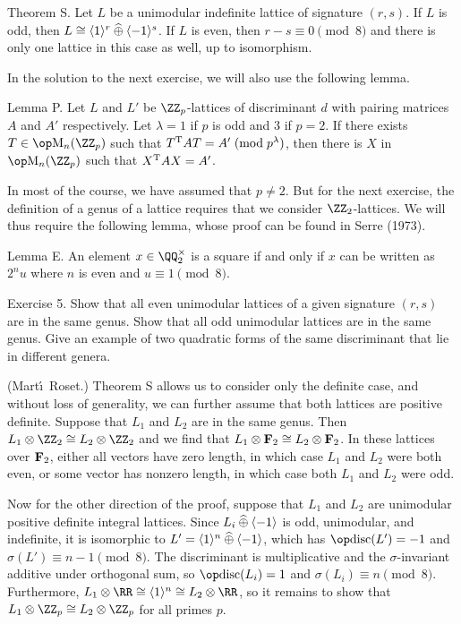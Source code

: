 \proclaim Theorem S. Let $L$ be a unimodular indefinite lattice of signature $(r,s)$.
If $L$ is odd, then $L\cong \langle 1\rangle^r \mathbin{\widehat\oplus} \langle -1\rangle^s$. If $L$ is even, then
$r-s \equiv 0\pmod 8$ and there is only one lattice in this case as well, up to isomorphism.\slug

In the solution to the next exercise, we will also use the following lemma.

\proclaim Lemma P. Let $L$ and $L'$ be $\ZZ_p$-lattices of discriminant $d$ with pairing matrices $A$
and $A'$ respectively. Let $\lambda = 1$ if $p$ is odd and $3$ if $p=2$.
If there exists $T\in \M_n(\ZZ_p)$ such that $T^{\rm T} AT = A'\;({\rm mod}\;p^\lambda)$, then there is $X$ in $\M_n(\ZZ_p)$
such that $X^{\rm T} A X = A'$.\slug

In most of the course, we have assumed that $p\ne 2$. But for the next exercise, the definition of a
genus of a lattice requires that we consider $\ZZ_2$-lattices. We will thus require the following lemma,
whose proof can be found in Serre (1973).

\proclaim Lemma E. An element $x\in \QQ_2^\times$ is a square if and only if $x$ can be written as $2^n u$ where
$n$ is even and $u\equiv 1\pmod 8$.\slug

\nineproclaim
Exercise 5. Show that all even unimodular lattices of a given signature $(r,s)$ are in the same
genus. Show that all odd unimodular lattices are in the same genus. Give an example of two quadratic forms
of the same discriminant that lie in different genera.

\nineproof (Mart\'\i\ Roset.)
Theorem S allows us to consider only the definite case, and without loss of generality, we can further assume
that both lattices are positive definite.
Suppose that $L_1$ and $L_2$ are in the same genus. Then $L_1\otimes \ZZ_2 \cong L_2\otimes \ZZ_2$
and we find that $L_1\otimes {\bf F}_2\cong L_2\otimes {\bf F}_2$. In these lattices over ${\bf F}_2$, either
all vectors have zero length, in which case $L_1$ and $L_2$ were both even, or some vector has nonzero length,
in which case both $L_1$ and $L_2$ were odd.

Now for the other direction of the proof, suppose that $L_1$ and $L_2$ are unimodular positive
definite integral lattices. Since $L_i \mathbin{\widehat\oplus} \langle -1\rangle$ is odd, unimodular, and indefinite,
it is isomorphic to $L'=\langle 1\rangle^n \mathbin{\widehat\oplus} \langle -1\rangle$, which has $\disc(L')=-1$ and
$\sigma(L') \equiv n-1\pmod 8$. The discriminant is multiplicative and the $\sigma$-invariant additive
under orthogonal sum, so $\disc(L_i) = 1$ and $\sigma(L_i) \equiv n\pmod 8$.
Furthermore, $L_1\otimes \RR \cong \langle 1\rangle ^n \cong L_2\otimes \RR$, so it remains to show
that $L_1\otimes \ZZ_p \cong L_2\otimes \ZZ_p$ for all primes $p$.

